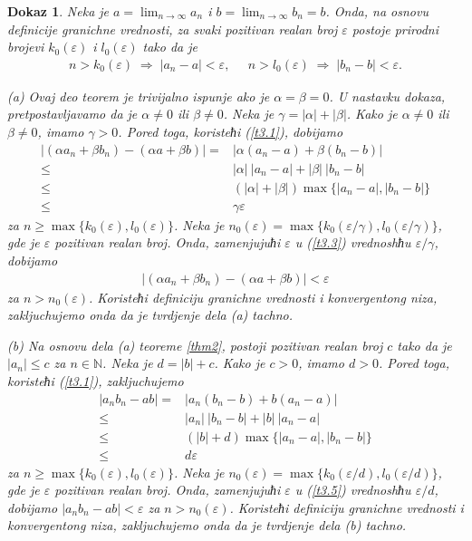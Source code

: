 \documentclass[11pt,a4paper]{article}
\newtheorem*{dokaz}{Dokaz}
\begin{document}
\begin{dokaz}
Neka je $a=\displaystyle\lim_{n\rightarrow\infty}a_n$ i 
$b=\displaystyle\lim_{n\rightarrow\infty}b_n=b$. 
Onda, na osnovu definicije granichne vrednosti, 
za svaki pozitivan realan broj $\varepsilon$ postoje 
prirodni brojevi $k_{0}(\varepsilon)$ i $l_{0}(\varepsilon)$ 
tako da je 
\begin{align}\label{t3.1}
    n>k_{0}(\varepsilon) \;\Rightarrow\; |a_{n}-a|<\varepsilon, 
    \;\;\;\;\; 
    n>l_{0}(\varepsilon) \;\Rightarrow\; |b_n-b|<\varepsilon. 
\end{align}

(a) Ovaj deo teorem je trivijalno ispunje ako je $\alpha=\beta=0$. 
U nastavku dokaza, pretpostavljavamo da je $\alpha\neq 0$ ili 
$\beta\neq 0$. 
Neka je $\gamma=|\alpha|+|\beta|$. 
Kako je $\alpha\neq 0$ ili $\beta\neq 0$, 
imamo $\gamma>0$. 
Pored toga, koristeћi (\ref{t3.1}), dobijamo 
\begin{align}\label{t3.3}
    |(\alpha a_n + \beta b_n) - (\alpha a + \beta b)|
    =&
    |\alpha(a_n-a)+\beta(b_n-b)|
    \nonumber\\
    \leq &
    |\alpha|\:|a_n-a| 
    + 
    |\beta|\:|b_n-b|
    \nonumber\\
    \leq &
    (|\alpha|+|\beta|)
    \max\{|a_n-a|,|b_n-b| \}
    \nonumber\\
    \leq &
    \gamma\varepsilon
\end{align}
za $n\geq\max\{k_{0}(\varepsilon),l_{0}(\varepsilon)\}$. 
Neka je 
$n_{0}(\varepsilon)=\max\{k_{0}(\varepsilon/\gamma),
l_{0}(\varepsilon/\gamma)\}$, gde je $\varepsilon$ 
pozitivan realan broj. 
Onda, zamenjujuћi $\varepsilon$ u (\ref{t3.3})  
vrednoshћu $\varepsilon/\gamma$, dobijamo 
\begin{align*}
    |(\alpha a_n + \beta b_n) - (\alpha a + \beta b)|<\varepsilon
\end{align*}
za $n>n_{0}(\varepsilon)$. 
Koristeћi definiciju granichne vrednosti i konvergentong niza, 
zakljuchujemo onda da je tvrdjenje dela (a) tachno. 

(b) Na osnovu dela (a) teoreme \ref{thm2}, 
postoji pozitivan realan broj $c$ tako da je 
$|a_n|\leq c$ za $n\in\mathbb{N}$. 
Neka je $d=|b|+c$. 
Kako je $c>0$, imamo $d>0$. 
Pored toga, koristeћi (\ref{t3.1}), zakljuchujemo  
\begin{align}\label{t3.5}
    |a_n b_n - ab|
    =&
    |a_n(b_n-b)+b(a_n-a)|
    \nonumber\\
    \leq &
    |a_n|\:|b_n-b| 
    + 
    |b|\:|a_n-a|
    \nonumber\\
    \leq &
    (|b|+d)
    \max\{|a_n-a|,|b_n-b| \}
    \nonumber\\
    \leq &
    d\varepsilon
\end{align}
za $n\geq\max\{k_{0}(\varepsilon),l_{0}(\varepsilon)\}$. 
Neka je 
$n_{0}(\varepsilon)=\max\{k_{0}(\varepsilon/d),
l_{0}(\varepsilon/d)\}$, gde je $\varepsilon$ 
pozitivan realan broj. 
Onda, zamenjujuћi $\varepsilon$ u (\ref{t3.5})  
vrednoshћu $\varepsilon/d$, dobijamo 
$|a_n b_n - ab|<\varepsilon$ 
za $n>n_{0}(\varepsilon)$. 
Koristeћi definiciju granichne vrednosti i konvergentong niza, 
zakljuchujemo onda da je tvrdjenje dela (b) tachno. 


\end{dokaz}
\end{document}
